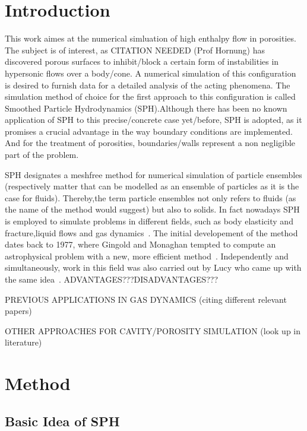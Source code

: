 \documentclass{report}
\begin{document}


\tableofcontents
\chapter{Introduction}
\label{sec:intro}


This work aimes at the numerical simluation of high enthalpy flow in
porosities. The subject is of interest, as CITATION
NEEDED (Prof Hornung) has discovered porous surfaces to inhibit/block a
certain form of instabilities in hypersonic flows over a body/cone. A numerical
simulation of this configuration is desired to furnish data for a detailed
analysis of the acting phenomena. The simulation method of choice for the first approach
to this configuration is called Smoothed Particle Hydrodynamics (SPH).Although
there has been no known application of SPH to this precise/concrete case yet/before,
SPH is adopted, as it promises a crucial advantage in the way boundary
conditions are implemented. And for the treatment of porosities,
boundaries/walls represent a non negligible part of the problem.

SPH designates a meshfree method for numerical simulation of particle
ensembles (respectively matter that can be modelled as an ensemble of
particles as it is the case for fluids).
Thereby,the term particle ensembles not only refers
to fluids (as the name of the method would suggest) but also to solids. In
fact nowadays SPH is employed to simulate problems in different fields,
such as body elasticity and fracture,liquid flows and gas
dynamics~\cite{Monaghan2005}.
The initial developement of the method dates back to 1977, where Gingold and
Monaghan tempted to compute an astrophysical problem with a new, more
efficient method~\cite{Gingold1977}. Independently and simultaneously, work in
this field was also carried out by Lucy who came up with the same
idea~\cite{Lucy1977}.
ADVANTAGES???DISADVANTAGES???

PREVIOUS APPLICATIONS IN GAS DYNAMICS (citing different relevant papers)

OTHER APPROACHES FOR CAVITY/POROSITY SIMULATION (look up in literature)





\chapter{Method}
\label{sec:method}
\section{Basic Idea of SPH}
\label{sec:BasicsSPH}
\end{document}
